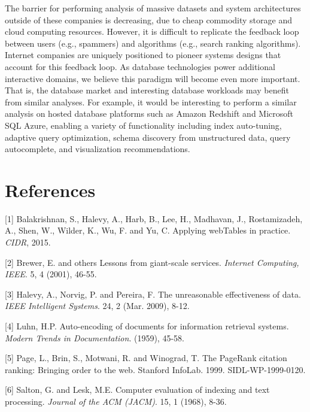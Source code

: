\documentclass[b5paper,11pt,twoside,openright]{book}
\begin{document}
The barrier for performing analysis of massive datasets and system
architectures outside of these companies is decreasing, due to cheap
commodity storage and cloud computing resources. However, it is
difficult to replicate the feedback loop between users (e.g., spammers)
and algorithms (e.g., search ranking algorithms). Internet companies are
uniquely positioned to pioneer systems designs that account for this
feedback loop. As database technologies power additional interactive
domains, we believe this paradigm will become even more important. That
is, the database market and interesting database workloads may benefit
from similar analyses. For example, it would be interesting to perform a
similar analysis on hosted database platforms such as Amazon Redshift
and Microsoft SQL Azure, enabling a variety of functionality including
index auto-tuning, adaptive query optimization, schema discovery from
unstructured data, query autocomplete, and visualization
recommendations.

\section*{References}

\leavevmode\hypertarget{ref-webtables-update}{}%
{[}1{]} Balakrishnan, S., Halevy, A., Harb, B., Lee, H., Madhavan, J.,
Rostamizadeh, A., Shen, W., Wilder, K., Wu, F. and Yu, C. Applying
webTables in practice. \emph{CIDR}, 2015.

\leavevmode\hypertarget{ref-harvest-yield}{}%
{[}2{]} Brewer, E. and others Lessons from giant-scale services.
\emph{Internet Computing, IEEE}. 5, 4 (2001), 46-55.

\leavevmode\hypertarget{ref-unreasonable-data}{}%
{[}3{]} Halevy, A., Norvig, P. and Pereira, F. The unreasonable
effectiveness of data. \emph{IEEE Intelligent Systems}. 24, 2 (Mar.
2009), 8-12.

\leavevmode\hypertarget{ref-luhn}{}%
{[}4{]} Luhn, H.P. Auto-encoding of documents for information retrieval
systems. \emph{Modern Trends in Documentation}. (1959), 45-58.

\leavevmode\hypertarget{ref-pagerank}{}%
{[}5{]} Page, L., Brin, S., Motwani, R. and Winograd, T. The PageRank
citation ranking: Bringing order to the web. Stanford InfoLab. 1999.
SIDL-WP-1999-0120.

\leavevmode\hypertarget{ref-salton-indexing}{}%
{[}6{]} Salton, G. and Lesk, M.E. Computer evaluation of indexing and
text processing. \emph{Journal of the ACM (JACM)}. 15, 1 (1968), 8-36.
\end{document}
